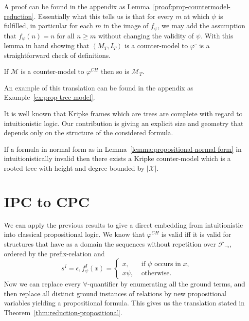 \documentclass[runningheads]{llncs}
\begin{document}
A proof can be found in the appendix as Lemma~\ref{proof:prop-countermodel-reduction}. Essentially what this tells us is that for every $m$ at which $\psi$ is fulfilled, in particular for each $m$ in the image of $f_\psi$, we may add the assumption that $f_\psi(n) = n$ for all $n\geq m$ without changing the validity of $\psi$.
With this lemma in hand showing that $(M_T, I_T)$ is a counter-model to $\varphi^\circ$ is a straightforward check of definitions.

\begin{corollary}\label{cor:prop-tree-model}
	If $\mathcal M$ is a counter-model to $\varphi^{CH}$ then so is $\mathcal M_T$.
\end{corollary}

An example of this translation can be found in the appendix as Example~\ref{ex:prop-tree-model}.

\begin{remark}
	It is well known that Kripke frames which are trees are complete with regard to intuitionistic logic. Our contribution is giving an explicit size and geometry that depends only on the structure of the considered formula.
\end{remark}

\begin{corollary}
	If a formula in normal form as in Lemma~\ref{lemma:propositional-normal-form} in intuitionistically invalid then there exists a Kripke counter-model which is a rooted tree with height and degree bounded by $|\mathcal X|$.
\end{corollary}

\section{IPC to CPC}

We can apply the previous results to give a direct embedding from intuitionistic into classical propositional logic. We know that $\varphi^{CH}$ is valid iff it is valid for structures that have as a domain the sequences without repetition over $\mathcal F_\to$, ordered by the prefix-relation and $$s^I = \epsilon, f_\psi^I(x) = \begin{cases}
	x, &\text{ if $\psi$ occurs in $x$,}\\
	x\psi, &\text{ otherwise.}
\end{cases}$$
Now we can replace every $\forall$-quantifier by enumerating all the ground terms, and then replace all distinct ground instances of relations by new propositional variables yielding a propositional formula. This gives us the translation stated in Theorem~\ref{thm:reduction-propositional}.
\end{document}
